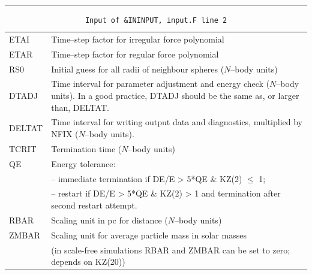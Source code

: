 \hrule
\noindent
\begin{longtable}{@{}p{1.5cm}p{13.0cm}}
\caption{\texttt{Input of \&ININPUT, input.F line 2}}
\label{table:ininput2}\\\hline
%
ETAI    & Time--step factor for irregular force polynomial\\
ETAR    & Time--step factor for regular force polynomial\\
RS0     & Initial guess for all radii of neighbour spheres ($N$--body units)\\
DTADJ   & Time interval for parameter adjustment and energy check ($N$--body units). In a good practice, DTADJ should be the same as, or larger than, DELTAT. \\
DELTAT  & Time interval for writing output data and diagnostics,
          multiplied by NFIX ($N$--body units).\\
TCRIT   & Termination time ($N$--body units) \\
QE      & Energy tolerance:\\
        & -- immediate termination if DE/E > 5*QE \& KZ(2) $\leq$ 1;\\
        & -- restart if DE/E > 5*QE \& KZ(2) > 1 and
         termination after second restart attempt.\\
RBAR    & Scaling unit in pc for distance ($N$--body units)\\
ZMBAR   & Scaling unit for average particle mass in solar masses\\
        & (in scale-free simulations RBAR and ZMBAR can be set to zero; depends on KZ(20)) \\
\end{longtable}

